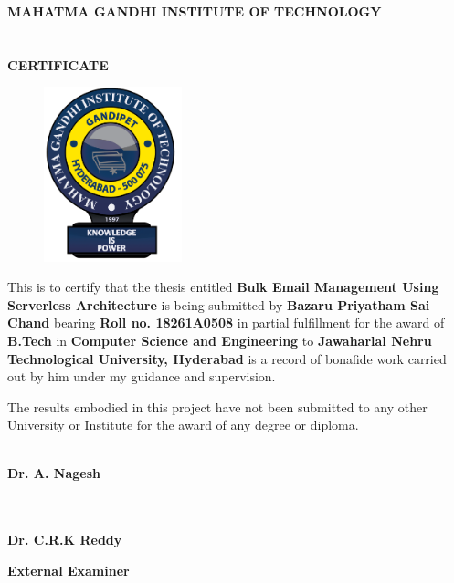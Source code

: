 \justifying
\begin{center}
    \Large\textbf{ MAHATMA GANDHI INSTITUTE OF TECHNOLOGY}\\    
    \small {}\\
     \\

    \vspace{0.5cm}
    \Large \textbf{CERTIFICATE}
    \begin{figure}[h]
        \centering
        \includegraphics[width=40mm]{figures/mgit_logo_1.png}
    \end{figure}
\end{center}
    \small
    This is to certify that the thesis entitled \textbf{Bulk Email Management Using Serverless Architecture} is being submitted by \textbf{Bazaru Priyatham Sai Chand} bearing \textbf{ Roll no. 18261A0508 } in partial fulfillment for the award of \textbf{B.Tech} in \textbf{Computer Science and Engineering} to \textbf{Jawaharlal Nehru Technological University, Hyderabad} is a record of bonafide work carried out by him under my guidance and supervision.
    
    \par
    \noindent
The results embodied in this project have not been submitted to any other University or Institute for the award of any degree or diploma. 
    
    \vspace{2cm}


    \noindent
	    \begin{minipage}[t]{0.2\textwidth}
			    \\
			    \textbf{Dr. A. Nagesh}\\
		    \\
	    \end{minipage}
	    \hfill
	    \begin{minipage}[t]{0.2\textwidth}
			    \\
			    \textbf{Dr. C.R.K Reddy}\\
	    \end{minipage}


    \vspace{3cm}
\begin{center}
    \textbf{External Examiner}
\end{center}
